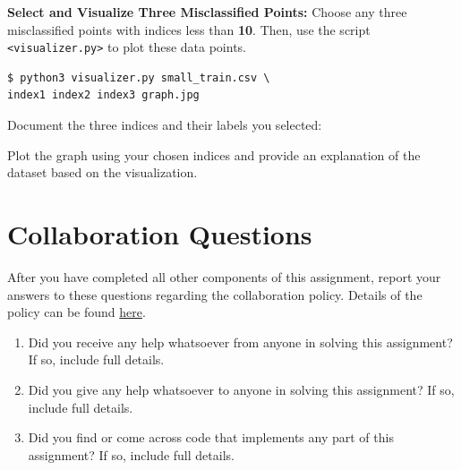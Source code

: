 \documentclass[11pt,addpoints,answers]{exam}
\begin{document}
\begin{questions}
\begin{parts}
\textbf{Select and Visualize Three Misclassified Points:}
   Choose any three misclassified points with indices less than \textbf{10}. Then, use the script \texttt{<visualizer.py>} to plot these data points. 
   \begin{lstlisting}[language=Shell]
$ python3 visualizer.py small_train.csv \
index1 index2 index3 graph.jpg
   \end{lstlisting}
\begin{subparts}
    \subpart[1]  
Document the three indices and their labels you selected:

\begin{your_solution}[title=index1 and its label,height=1.8cm,width=5.2cm]
\end{your_solution}
\begin{your_solution}[title=index2 and its label,height=1.8cm,width=5.2cm]
\end{your_solution}
\begin{your_solution}[title=index3 and its label,height=1.8cm,width=5.2cm]
\end{your_solution}

\subpart[2]  
Plot the graph using your chosen indices and provide an explanation of the dataset based on the visualization.

\begin{your_solution}[title=Plot of three misclassified data,height=8.5cm,width=6cm]
\end{your_solution}
\begin{your_solution}[title=Explanation,height=8.5cm,width=9cm]
\end{your_solution}
\end{subparts}








\end{parts}


    \newpage
\newpage
\section{Collaboration Questions}
After you have completed all other components of this assignment, report your answers to these questions regarding the collaboration policy. Details of the policy can be found \href{http://www.cs.cmu.edu/~mgormley/courses/10601/syllabus.html}{here}.
\begin{enumerate}
    \item Did you receive any help whatsoever from anyone in solving this assignment? If so, include full details.
    \item Did you give any help whatsoever to anyone in solving this assignment? If so, include full details.
    \item Did you find or come across code that implements any part of this assignment? If so, include full details.
\end{enumerate}


\end{questions}
\end{document}
